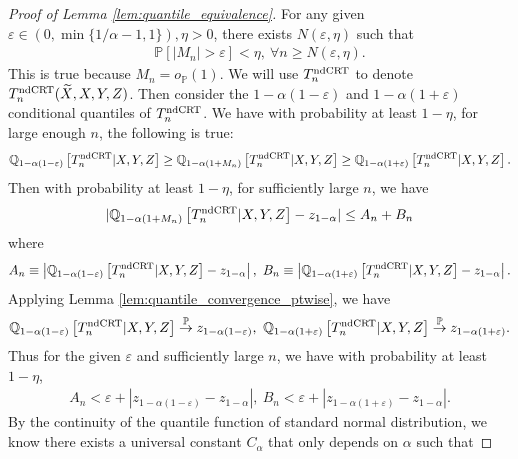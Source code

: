 \documentclass[12pt]{article}
\theoremstyle{definition}
\def\P{\mathbb{P}}
\def\P{\mathbb{P}}
\renewcommand{\P}{\mathbb{P}}							%
\newcommand{\Q}{\mathbb{Q}}								%
\newcommand{\convp}{\overset{\mathbb{P}}{\rightarrow}}             %
\newcommand{\srx}{X}									%
\newcommand{\srz}{Z}									%
\newcommand{\srxk}{\widetilde X}						%
\newcommand{\sry}{Y}									%
\newcommand{\ndCRThat}{\textnormal{ndCRT}}	%
\begin{document}
\begin{proof}[Proof of Lemma \ref{lem:quantile_equivalence}]
  For any given $\varepsilon\in (0,\min\{1/\alpha-1,1\}),\eta>0$, there exists $N(\varepsilon,\eta)$ such that 
  \begin{align*}
    \P[|M_n|>\varepsilon]<\eta,\ \forall n\geq N(\varepsilon,\eta).
  \end{align*}
  This is true because $M_n=o_\P(1)$. We will use $T_n^{\ndCRThat}$ to denote $T_n^{\ndCRThat}(\srxk,\srx,\sry,\srz)$. Then consider the $1-\alpha(1-\varepsilon)$ and $1-\alpha(1+\varepsilon)$ conditional quantiles of $T_n^{\ndCRThat}$. We have with probability at least $1-\eta$, for large enough $n$, the following is true:
  \begin{align*}
    \Q_{1-\alpha(1-\varepsilon)}\left[T_n^{\ndCRThat}|\srx,\sry,\srz\right]\geq \Q_{1-\alpha(1+M_n)}\left[T_n^{\ndCRThat}|\srx,\sry,\srz\right]\geq \Q_{1-\alpha(1+\varepsilon)}\left[T_n^{\ndCRThat}|\srx,\sry,\srz\right].
  \end{align*}
  Then with probability at least $1-\eta$, for sufficiently large $n$, we have
  \begin{align}\label{eq:quantile_upper_bound}
    |\Q_{1-\alpha(1+M_n)}\left[T_n^{\ndCRThat}|\srx,\sry,\srz\right] - z_{1-\alpha}|\leq A_n + B_n
  \end{align}
  where 
  \begin{align*}
    A_n\equiv \left|\Q_{1-\alpha(1-\varepsilon)}\left[T_n^{\ndCRThat}|\srx,\sry,\srz\right]- z_{1-\alpha}\right|,\ B_n\equiv \left|\Q_{1-\alpha(1+\varepsilon)}\left[T_n^{\ndCRThat}|\srx,\sry,\srz\right]- z_{1-\alpha}\right|.
  \end{align*}
  Applying Lemma \ref{lem:quantile_convergence_ptwise}, we have 
  \begin{align*}
    \Q_{1-\alpha(1-\varepsilon)}\left[T_n^{\ndCRThat}|\srx,\sry,\srz\right]\convp z_{1-\alpha(1-\varepsilon)},\ \Q_{1-\alpha(1+\varepsilon)}\left[T_n^{\ndCRThat}|\srx,\sry,\srz\right]\convp z_{1-\alpha(1+\varepsilon)}.
  \end{align*}
  Thus for the given $\varepsilon$ and sufficiently large $n$, we have with probability at least $1-\eta$,
  \begin{align*}
    A_n< \varepsilon+|z_{1-\alpha(1-\varepsilon)}-z_{1-\alpha}|,\ B_n< \varepsilon+|z_{1-\alpha(1+\varepsilon)}-z_{1-\alpha}|.
  \end{align*}
  By the continuity of the quantile function of standard normal distribution, we know there exists a universal constant $C_\alpha$ that only depends on $\alpha$ such that 

\end{proof}
\end{document}

